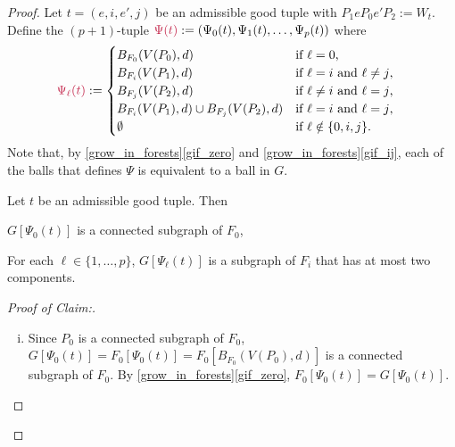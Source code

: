 \documentclass{patmorin}
\newcommand{\pat}[1]{\textcolor{Blue}{Pat: #1}}
\newcommand{\piotr}[1]{\textcolor{red}{Piotr: #1}}
\newenvironment{clmproof}{\begin{proof}[Proof of Claim:]\renewcommand{\qedsymbol}{\rule{1ex}{1ex}}}{\end{proof}}
\begin{document}
\begin{proof}
Let $t=(e,i,e',j)$ be an admissible good tuple with $P_1eP_0e'P_2:=W_t$.
Define the $(p+1)$-tuple $\mathdefin{\Psi(t)}:=(\Psi_0(t),\Psi_1(t),\ldots,\Psi_p(t))$ where
\begin{align*}
\mathdefin{\Psi_\ell(t)} &:=\begin{cases}
B_{F_0}(V(P_0),d)&\textrm{if $\ell=0$,}\\
B_{F_i}(V(P_1),d)&\textrm{if $\ell=i$ and $\ell\neq j$,}\\
B_{F_j}(V(P_2),d)&\textrm{if $\ell\neq i$ and $\ell= j$,}\\
B_{F_i}(V(P_1),d)\cup B_{F_j}(V(P_2),d)&\textrm{if $\ell= i$ and $\ell= j$,}\\
\emptyset&\textrm{if $\ell\notin\{0,i,j\}$.}
\end{cases}
\end{align*}
Note that, by \cref{grow_in_forests}\cref{gif_zero} and \cref{grow_in_forests}\cref{gif_ij}, each of the balls that defines $\Psi$ is equivalent to a ball in $G$.

\begin{clm}
Let $t$ be an admissible good tuple. Then
\begin{compactenum}[(i)]
\item $G[\Psi_0(t)]$ is a connected subgraph of $F_0$,
\item For each $\ell\in\{1,\ldots,p\}$, $G[\Psi_\ell(t)]$ is a subgraph of $F_i$ that has at most two components.

\end{compactenum}
\end{clm}

\begin{clmproof}\
  \begin{enumerate}[(i)]
    \item Since $P_0$ is a connected subgraph of $F_0$, $G[\Psi_0(t)]=F_0[\Psi_0(t)]=F_0[B_{F_0}(V(P_0),d)]$ is a connected subgraph of $F_0$.  By \cref{grow_in_forests}\cref{gif_zero}, $F_0[\Psi_0(t)]=G[\Psi_0(t)]$.


\end{enumerate}
\end{clmproof}
\end{proof}
\end{document}
